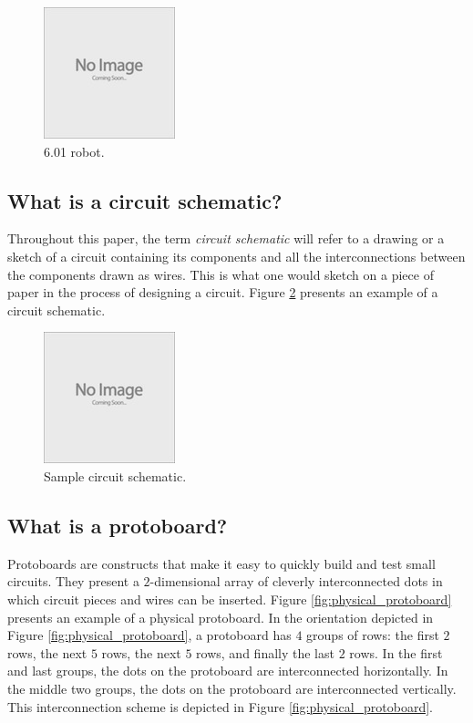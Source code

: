 \begin{figure}
\begin{center}
\includegraphics{Images/placeholder.jpg}
\caption{6.01 robot.}
\label{fig:robot}
\end{center}
\end{figure}

\subsection{What is a circuit schematic?}

Throughout this paper, the term \textit{circuit schematic} will refer to a
drawing or a sketch of a circuit containing its components and all the
interconnections between the components drawn as wires. This is what one would
sketch on a piece of paper in the process of designing a circuit. Figure
\ref{fig:schematic} presents an example of a circuit schematic.

\begin{figure}
\begin{center}
\includegraphics{Images/placeholder.jpg}
\caption{Sample circuit schematic.}
\label{fig:schematic}
\end{center}
\end{figure}

\subsection{What is a protoboard?}

Protoboards are constructs that make it easy to quickly build and test small
circuits. They present a $2$-dimensional array of cleverly interconnected dots
in which circuit pieces and wires can be inserted. Figure
\ref{fig:physical_protoboard} presents an example of a physical protoboard. In
the orientation depicted in Figure \ref{fig:physical_protoboard}, a protoboard
has $4$ groups of rows: the first $2$ rows, the next $5$ rows, the next $5$
rows, and finally the last $2$ rows. In the first and last groups, the dots on
the protoboard are interconnected horizontally. In the middle
two groups, the dots on the protoboard are interconnected vertically. This
interconnection scheme is depicted in Figure \ref{fig:physical_protoboard}.

